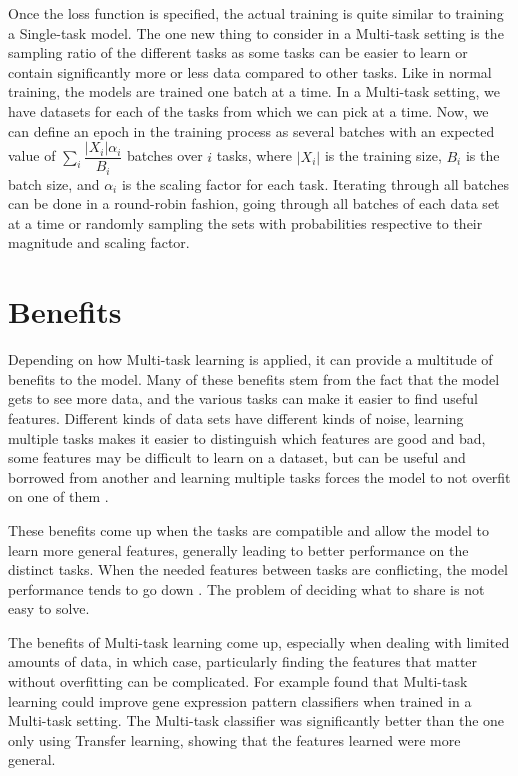 Once the loss function is specified, the actual training is quite similar to training a Single-task model.
The one new thing to consider in a Multi-task setting is the sampling ratio of the different tasks as some tasks can be easier to learn or contain significantly more or less data compared to other tasks.
Like in normal training, the models are trained one batch at a time.
In a Multi-task setting, we have datasets for each of the tasks from which we can pick at a time.
Now, we can define an epoch in the training process as several batches with an expected value of $\sum_i{ \dfrac{|X_i| \alpha_i}{B_i}}$ batches over $i$ tasks, where $|X_i|$ is the training size, $B_i$ is the batch size, and $\alpha_i$ is the scaling factor for each task.
Iterating through all batches can be done in a round-robin fashion,  going through all batches of each data set at a time or randomly sampling the sets with probabilities respective to their magnitude and scaling factor.

\section{Benefits}
Depending on how Multi-task learning is applied, it can provide a multitude of benefits to the model.
Many of these benefits stem from the fact that the model gets to see more data, and the various tasks can make it easier to find useful features.
Different kinds of data sets have different kinds of noise, learning multiple tasks makes it easier to distinguish which features are good and bad, some features may be difficult to learn on a dataset, but can be useful and borrowed from another and learning multiple tasks forces the model to not overfit on one of them \citep{ruderOverview}.

These benefits come up when the tasks are compatible and allow the model to learn more general features, generally leading to better performance on the distinct tasks.
When the needed features between tasks are conflicting, the model performance tends to go down \citep{uberNet}.
The problem of deciding what to share is not easy to solve.

The benefits of Multi-task learning come up, especially when dealing with limited amounts of data, in which case, particularly finding the features that matter without overfitting can be complicated.
For example \citep{biologicalMultitask} found that Multi-task learning could improve gene expression pattern classifiers when trained in a Multi-task setting.
The Multi-task classifier was significantly better than the one only using Transfer learning, showing that the features learned were more general.

